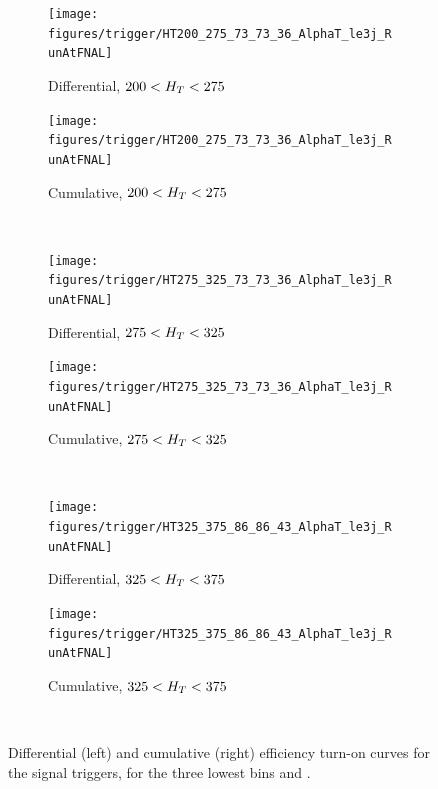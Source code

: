\begin{figure}[p!]
  \centering
    \begin{subfigure}[b]{0.48\textwidth}
      \texttt{[image: figures/trigger/HT200\_275\_73\_73\_36\_AlphaT\_le3j\_RunAtFNAL]}
      \caption{Differential, $200 < H_T < 275 $~\gev}
    \end{subfigure}
    \begin{subfigure}[b]{0.48\textwidth}
      \texttt{[image: figures/trigger/HT200\_275\_73\_73\_36\_AlphaT\_le3j\_RunAtFNAL]}
      \caption{Cumulative, $200 < H_T < 275 $~\gev}
    \end{subfigure} \\
    \vspace{0.5cm}\begin{subfigure}[b]{0.48\textwidth}
      \texttt{[image: figures/trigger/HT275\_325\_73\_73\_36\_AlphaT\_le3j\_RunAtFNAL]}
      \caption{Differential, $275 < H_T < 325 $~\gev}
    \end{subfigure}
    \begin{subfigure}[b]{0.48\textwidth}
      \texttt{[image: figures/trigger/HT275\_325\_73\_73\_36\_AlphaT\_le3j\_RunAtFNAL]}
      \caption{Cumulative, $275 < H_T < 325 $~\gev}
    \end{subfigure} \\
    \vspace{0.5cm}\begin{subfigure}[b]{0.48\textwidth}
      \texttt{[image: figures/trigger/HT325\_375\_86\_86\_43\_AlphaT\_le3j\_RunAtFNAL]}
      \caption{Differential, $325 < H_T < 375 $~\gev}
    \end{subfigure}
    \begin{subfigure}[b]{0.48\textwidth}
      \texttt{[image: figures/trigger/HT325\_375\_86\_86\_43\_AlphaT\_le3j\_RunAtFNAL]}
      \caption{Cumulative, $325 < H_T < 375 $~\gev}
    \end{subfigure} \\
  
    \caption{\label{fig:eff_alphat_le3j}
      Differential (left) and cumulative (right) efficiency turn-on curves for 
      the signal triggers, for the three lowest \HT bins and \njlow.}
\end{figure}

